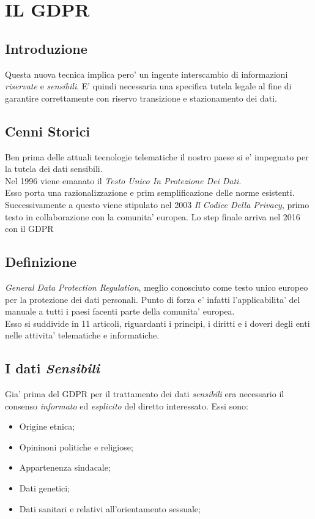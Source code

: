 \documentclass[a4paper,12pt]{article}
\begin{document}
\section{IL GDPR}
\subsection{Introduzione}
Questa nuova tecnica implica pero' un ingente interscambio di informazioni \textit{riservate} e \textit{sensibili}.
E' quindi necessaria una specifica tutela legale al fine di garantire correttamente con riservo transizione e stazionamento dei dati.

\subsection{Cenni Storici}
Ben prima delle attuali tecnologie telematiche il nostro paese si e' impegnato per la tutela dei dati sensibili.\\ Nel 1996 viene emanato
il \textit{Testo Unico In  Protezione Dei Dati}. \\

Esso porta una razionalizzazione e prim semplificazione delle norme esistenti. Successivamente a questo
viene stipulato nel 2003 \textit{Il Codice Della Privacy}, primo testo in collaborazione con la comunita' europea.
Lo step finale arriva nel 2016 con il GDPR 

\subsection{Definizione}
\textit{General Data Protection Regulation}, meglio conosciuto come testo unico europeo per la protezione dei dati personali.
Punto di forza e' infatti l'applicabilita' del manuale a tutti i paesi facenti parte della comunita' europea.
\\Esso si suddivide in 11 articoli, riguardanti i principi, i diritti e i doveri degli enti nelle attivita' telematiche e informatiche.

\subsection{I dati \textit{Sensibili}}
Gia' prima del GDPR per il trattamento dei dati \textit{sensibili} era necessario il consenso \textit{informato} ed \textit{esplicito} del diretto interessato.
Essi sono:
\begin{itemize}
    \item Origine etnica;
    \item Opininoni politiche e religiose;
    \item Appartenenza sindacale;
    \item Dati genetici;
    \item Dati sanitari e relativi all'orientamento sessuale;
\end{itemize}
\end{document}
